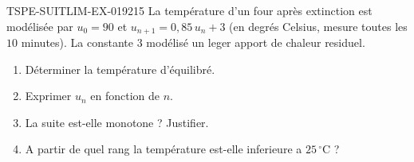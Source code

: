 \begin{exercice}{TSPE-SUITLIM-EX-019}{2}{15}
La température d'un four après extinction est modélisée par $u_0 = 90$ et $u_{n+1} = 0{,}85\,u_n + 3$ (en degrés Celsius, mesure toutes les $10$ minutes). La constante $3$ modélisé un leger apport de chaleur residuel.
\begin{enumerate}
  \item Déterminer la température d'équilibré.
  \item Exprimer $u_n$ en fonction de $n$.
  \item La suite est-elle monotone ? Justifier.
  \item A partir de quel rang la température est-elle inferieure a $25\,^\circ$C ?
\end{enumerate}
\end{exercice}
